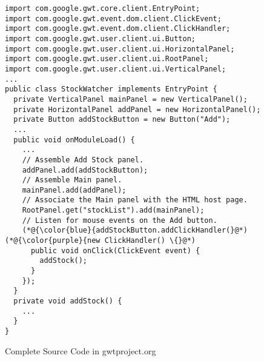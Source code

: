 \begin{figure}[htbp]
	\centering
\begin{lstlisting}[]
import com.google.gwt.core.client.EntryPoint;
import com.google.gwt.event.dom.client.ClickEvent;
import com.google.gwt.event.dom.client.ClickHandler;
import com.google.gwt.user.client.ui.Button;
import com.google.gwt.user.client.ui.HorizontalPanel;
import com.google.gwt.user.client.ui.RootPanel;
import com.google.gwt.user.client.ui.VerticalPanel;
...
public class StockWatcher implements EntryPoint {
  private VerticalPanel mainPanel = new VerticalPanel();
  private HorizontalPanel addPanel = new HorizontalPanel();
  private Button addStockButton = new Button("Add");
  ...
  public void onModuleLoad() {
    ...
    // Assemble Add Stock panel.
    addPanel.add(addStockButton);
    // Assemble Main panel.
    mainPanel.add(addPanel);
    // Associate the Main panel with the HTML host page.
    RootPanel.get("stockList").add(mainPanel);
    // Listen for mouse events on the Add button.
    (*@{\color{blue}{addStockButton.addClickHandler(}@*) (*@{\color{purple}{new ClickHandler() \{}@*)
      public void onClick(ClickEvent event) {
        addStock();
      }
    });
  }
  private void addStock() {
    ...
  }
}
\end{lstlisting}
        \vspace{-12pt}
        \caption{Complete Source Code in gwtproject.org}
        \label{fig:example3}
\end{figure}
